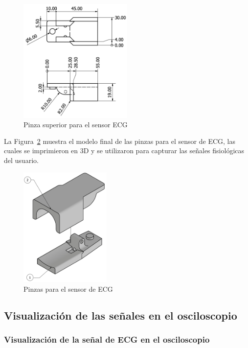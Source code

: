     \begin{figure}[H]
        \centering
        \includegraphics[width=0.5\textwidth]{img/Desarrollo/pinza_superior.png}
        \caption{Pinza superior para el sensor ECG}
        \label{fig:Pinza_Superior}
    \end{figure}

    La Figura~\ref{fig:Pinzas_ECG} muestra el modelo final de las pinzas para el sensor de ECG, las cuales se imprimieron en 3D y se utilizaron para capturar las señales fisiológicas del usuario.

    \begin{figure}[H]
        \centering
        \includegraphics[width=0.4\textwidth]{img/Desarrollo/pinzas_electrocardiograma.png}
        \caption{Pinzas para el sensor de ECG}
        \label{fig:Pinzas_ECG}
    \end{figure}

    \subsection{Visualización de las señales en el osciloscopio}
        \subsubsection{Visualización de la señal de ECG en el osciloscopio}

